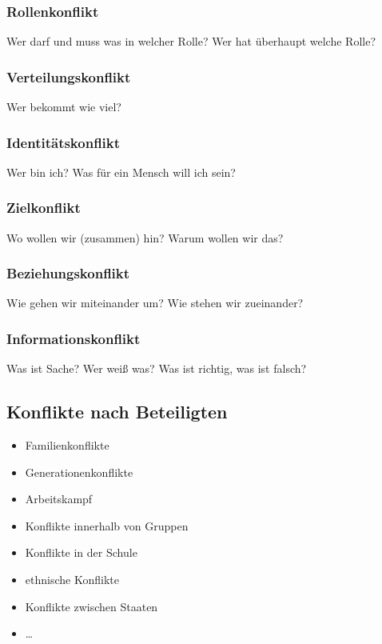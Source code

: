 \subsubsection{Rollenkonflikt}

Wer darf und muss was in welcher Rolle? Wer hat überhaupt welche Rolle?

\subsubsection{Verteilungskonflikt}

Wer bekommt wie viel?

\subsubsection{Identitätskonflikt}

Wer bin ich? Was für ein Mensch will ich sein?

\subsubsection{Zielkonflikt}

Wo wollen wir (zusammen) hin? Warum wollen wir das?

\subsubsection{Beziehungskonflikt}

Wie gehen wir miteinander um? Wie stehen wir zueinander?

\subsubsection{Informationskonflikt}

Was ist Sache? Wer weiß was? Was ist richtig, was ist falsch?

\subsection{Konflikte nach Beteiligten}

\begin{itemize}
    \item Familienkonflikte
    \item Generationenkonflikte
    \item Arbeitskampf
    \item Konflikte innerhalb von Gruppen
    \item Konflikte in der Schule
    \item ethnische Konflikte
    \item Konflikte zwischen Staaten
    \item \ldots
\end{itemize}

